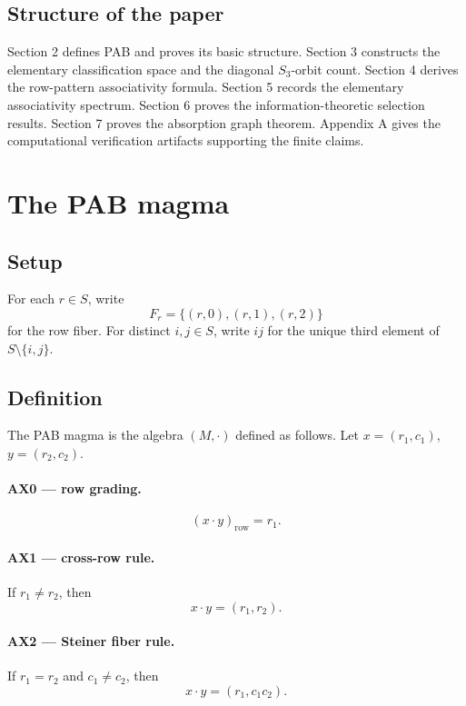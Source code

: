 \documentclass[11pt]{article}
\begin{document}
\subsection{Structure of the paper}

Section 2 defines PAB and proves its basic structure. Section 3 constructs the
elementary classification space and the diagonal \(S_3\)-orbit count. Section 4
derives the row-pattern associativity formula. Section 5 records the elementary
associativity spectrum. Section 6 proves the information-theoretic selection
results. Section 7 proves the absorption graph theorem. Appendix A gives the computational
verification artifacts supporting the finite claims.



\section{The PAB magma}

\subsection{Setup}

For each \(r\in S\), write
\[
F_r=\{(r,0),(r,1),(r,2)\}
\]
for the row fiber. For distinct \(i,j\in S\), write \(ij\) for the unique third
element of \(S\setminus\{i,j\}\).

\subsection{Definition}

The PAB magma is the algebra \((M,\cdot)\) defined as follows. Let
\(x=(r_1,c_1)\), \(y=(r_2,c_2)\).

\paragraph{AX0 --- row grading.} 
\[
(x\cdot y)_{\mathrm{row}}=r_1.
\]

\paragraph{AX1 --- cross-row rule.} If \(r_1\ne r_2\), then
\[
x\cdot y=(r_1,r_2).
\]

\paragraph{AX2 --- Steiner fiber rule.} If \(r_1=r_2\) and \(c_1\ne c_2\), then
\[
x\cdot y=(r_1,c_1c_2).
\]
\end{document}

